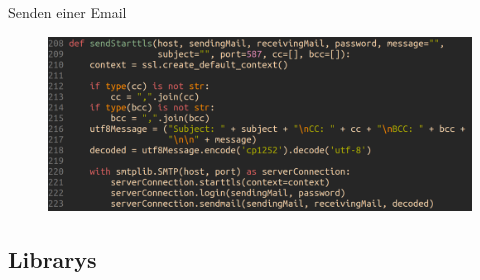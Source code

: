\documentclass[aspectratio=169]{beamer}
\begin{document}
\begin{frame}[plain]{Senden einer Email}
    \begin{figure}[h]
        \includegraphics[width=.8\textwidth]{media/codeFragment.png}
    \end{figure}
\end{frame}


\subsection{Librarys}
\end{document}
